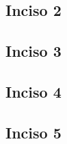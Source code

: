     \subsection{Inciso 2}
        
        \newpage
        
    \subsection{Inciso 3}
        
        \newpage
        
    \subsection{Inciso 4}
        
        \newpage
        
    \subsection{Inciso 5}
        
        \newpage
